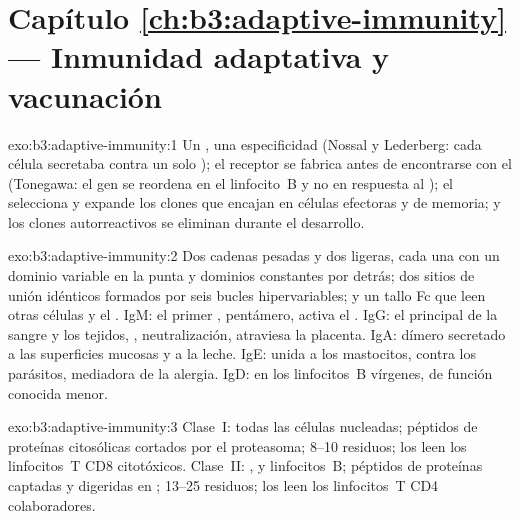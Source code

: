 \section*{Capítulo \ref{ch:b3:adaptive-immunity} --- Inmunidad adaptativa y vacunación}

\begin{solution}{exo:b3:adaptive-immunity:1}
Un , una especificidad (Nossal y Lederberg: cada célula
secretaba  contra un solo ); el receptor se fabrica
antes de encontrarse con el  (Tonegawa: el gen se reordena en el
linfocito~B y no en respuesta al ); el  selecciona y
expande los clones que encajan en células efectoras y de memoria; y los
clones autorreactivos se eliminan durante el desarrollo.
\end{solution}

\begin{solution}{exo:b3:adaptive-immunity:2}
Dos cadenas pesadas y dos ligeras, cada una con un dominio variable en la
punta y dominios constantes por detrás; dos sitios de unión idénticos
formados por seis bucles hipervariables; y un tallo Fc que leen otras
células y el . IgM: el primer , pentámero, activa el
. IgG: el  principal de la sangre y los tejidos,
, neutralización, atraviesa la placenta. IgA: dímero
secretado a las superficies mucosas y a la leche. IgE: unida a los
mastocitos, contra los parásitos, mediadora de la alergia. IgD: en los
linfocitos~B vírgenes, de función conocida menor.
\end{solution}

\begin{solution}{exo:b3:adaptive-immunity:3}
Clase~I: todas las células nucleadas; péptidos de proteínas citosólicas
cortados por el proteasoma; 8--10 residuos; los leen los linfocitos~T
CD8 citotóxicos. Clase~II: ,  y
linfocitos~B; péptidos de proteínas captadas y digeridas en ;
13--25 residuos; los leen los linfocitos~T CD4 colaboradores.
\end{solution}

